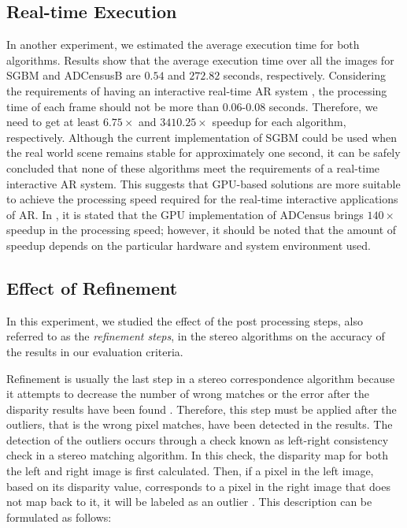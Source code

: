 \subsection{Real-time Execution}
In another experiment, we estimated the average execution time for both algorithms. Results show that the average execution time over all the images 
for SGBM and ADCensusB are $0.54$ and $272.82$ seconds, respectively.
Considering the requirements of having an interactive real-time AR system \cite{hertz00}, the processing time of each frame should not be more than 0.06-0.08 seconds.
Therefore, we need to get at least $6.75\times$ and $3410.25\times$ speedup for each algorithm, respectively. Although the current implementation of SGBM could be used when the real world scene remains stable for approximately one second, it can be safely concluded that
none of these algorithms meet the requirements of a real-time interactive AR system.
This suggests that GPU-based solutions are more suitable to achieve the processing speed required for the real-time 
interactive applications of AR. In \cite{mei11}, it is stated that the GPU implementation of ADCensus brings $140\times$ speedup in the processing speed; however,
it should be noted that the amount of speedup depends on the particular hardware and system environment used.

\subsection{Effect of Refinement}
In this experiment, we studied the effect of the post processing steps, also referred to as the \textit{refinement steps}, 
in the stereo algorithms on the accuracy of the results in our evaluation criteria. 

Refinement is usually the last step in a stereo correspondence algorithm because it attempts to decrease the 
number of wrong matches or the error after the disparity results have been found \cite{sch02}. Therefore, this step must be applied after the outliers, that is the wrong pixel matches, 
have been detected in the results.
The detection of the outliers occurs through a check known as left-right consistency check in a stereo matching algorithm. In this check, the disparity map for both
the left and right image is first calculated. Then, if a pixel in the left image, based on its disparity value, corresponds to a pixel in the right image
that does not map back to it, it will be labeled as an outlier \cite{sch02}. This description can be formulated as follows:

